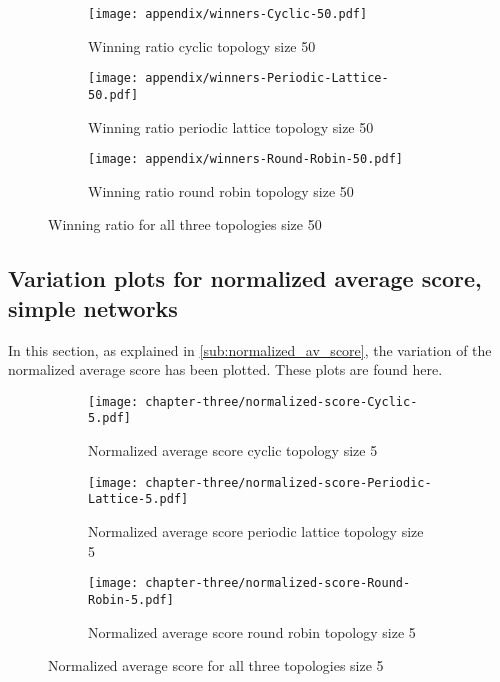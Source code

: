 \begin{figure}[H]
	\centering
	\begin{subfigure}[t]{0.75\textwidth}
		\centering
		\texttt{[image: appendix/winners-Cyclic-50.pdf]}
		\caption{Winning ratio cyclic topology size 50}
	\end{subfigure}
	\hfill
	\begin{subfigure}[t]{0.75\textwidth}\centering
		\centering
		\texttt{[image: appendix/winners-Periodic-Lattice-50.pdf]}
		\caption{Winning ratio periodic lattice topology size 50}
	\end{subfigure}
	\hfill
	\begin{subfigure}[t]{0.75\textwidth}\centering
		\centering
		\texttt{[image: appendix/winners-Round-Robin-50.pdf]}
		\caption{Winning ratio round robin topology size 50}
	\end{subfigure}
	\caption{Winning ratio for all three topologies size 50}
	\label{fig:winning-fifty}
\end{figure}

\subsection{Variation plots for normalized average score, simple networks}
\label{append:variation-plots}
In this section, as explained in \autoref{sub:normalized_av_score}, the variation of the
normalized average score has been plotted. These plots are found here.

\begin{figure}[H]
	\centering
	\begin{subfigure}[t]{0.75\textwidth}
		\centering
		\texttt{[image: chapter-three/normalized-score-Cyclic-5.pdf]}
		\caption{Normalized average score cyclic topology size 5}
	\end{subfigure}
	\hfill
	\begin{subfigure}[t]{0.75\textwidth}\centering
		\centering
		\texttt{[image: chapter-three/normalized-score-Periodic-Lattice-5.pdf]}
		\caption{Normalized average score periodic lattice topology size 5}
	\end{subfigure}
	\hfill
	\begin{subfigure}[t]{0.75\textwidth}\centering
		\centering
		\texttt{[image: chapter-three/normalized-score-Round-Robin-5.pdf]}
		\caption{Normalized average score round robin topology size 5}
	\end{subfigure}
	\caption{Normalized average score for all three topologies size 5}
	\label{fig:average-score-five}
\end{figure}

